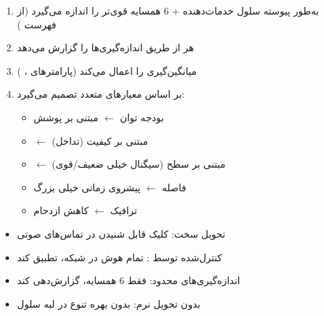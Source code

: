 \begin{enumerate}
\def\labelenumi{\arabic{enumi}.}
\tightlist
\item
   به‌طور پیوسته سلول خدمات‌دهنده + 6 همسایه قوی‌تر را اندازه می‌گیرد (از فهرست )
\item
   هر  از طریق  اندازه‌گیری‌ها را گزارش می‌دهد
\item
   میانگین‌گیری را اعمال می‌کند (پارامترهای ، )
\item
   بر اساس معیارهای متعدد تصمیم می‌گیرد:

  \begin{itemize}
  \tightlist
  \item
    بودجه توان  \ensuremath{\leftarrow} مبتنی بر پوشش
  \item
     \ensuremath{\leftarrow} مبتنی بر کیفیت (تداخل)
  \item
     \ensuremath{\leftarrow} مبتنی بر سطح (سیگنال خیلی ضعیف/\allowbreak{}قوی)
  \item
    فاصله \ensuremath{\leftarrow} پیشروی زمانی خیلی بزرگ
  \item
    ترافیک \ensuremath{\leftarrow} کاهش ازدحام
  \end{itemize}
\end{enumerate}


\begin{itemize}
\tightlist
\item
  تحویل سخت: کلیک قابل شنیدن در تماس‌های صوتی
\item
  کنترل‌شده توسط : تمام هوش در شبکه، تطبیق کند
\item
  اندازه‌گیری‌های محدود: فقط 6 همسایه، گزارش‌دهی کند
\item
  بدون تحویل نرم: بدون بهره تنوع در لبه سلول
\end{itemize}




\CNchained{}



